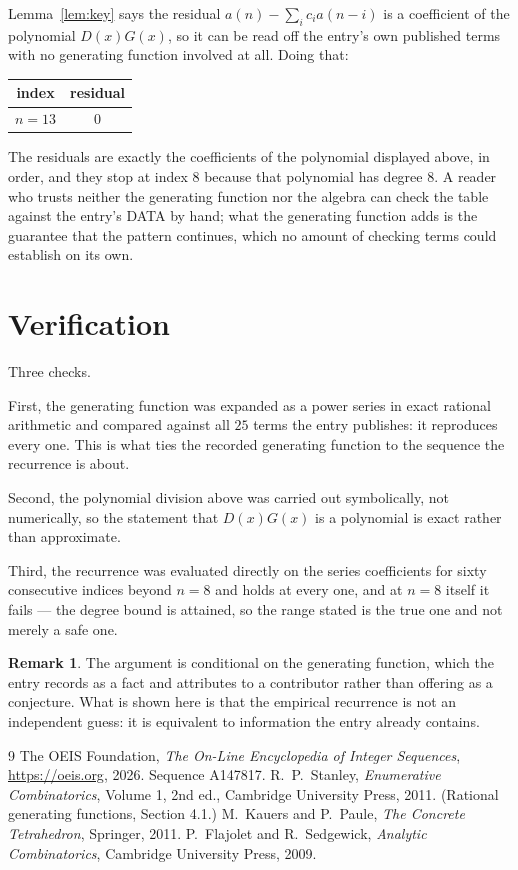 \documentclass[11pt,a4paper]{article}
\theoremstyle{plain}
\theoremstyle{definition}
\newtheorem{remark}[theorem]{Remark}
\begin{document}
Lemma~\ref{lem:key} says the residual $a(n)-\sum_ic_ia(n-i)$ is a coefficient of the
polynomial $D(x)G(x)$, so it can be read off the entry's own published terms with no
generating function involved at all. Doing that:
\begin{center}
\begin{tabular}{cc}
index & residual \\ \hline
$n=13$ & $0$
\end{tabular}
\end{center}
The residuals are exactly the coefficients of the polynomial displayed above, in order, and
they stop at index $8$ because that polynomial has degree $8$. A reader who trusts
neither the generating function nor the algebra can check the table against the entry's DATA
by hand; what the generating function adds is the guarantee that the pattern continues, which
no amount of checking terms could establish on its own.

\section{Verification}

Three checks.

First, the generating function was expanded as a power series in exact rational arithmetic and
compared against all $25$ terms the entry publishes: it reproduces every one. This is
what ties the recorded generating function to the sequence the recurrence is about.

Second, the polynomial division above was carried out symbolically, not numerically, so the
statement that $D(x)G(x)$ is a polynomial is exact rather than approximate.

Third, the recurrence was evaluated directly on the series coefficients for sixty consecutive
indices beyond $n=8$ and holds at every one, and at $n=8$ itself it fails --- the
degree bound is attained, so the range stated is the true one and not merely a safe one.

\begin{remark}
The argument is conditional on the generating function, which the entry records as a fact and
attributes to a contributor rather than offering as a conjecture. What is shown here is that
the empirical recurrence is not an independent guess: it is equivalent to information the
entry already contains.
\end{remark}

\begin{thebibliography}{9}
 The OEIS Foundation, \emph{The On-Line Encyclopedia of Integer
Sequences}, \url{https://oeis.org}, 2026. Sequence A147817.
 R.~P.~Stanley, \emph{Enumerative Combinatorics}, Volume 1, 2nd ed.,
Cambridge University Press, 2011. (Rational generating functions, Section 4.1.)
 M.~Kauers and P.~Paule, \emph{The Concrete Tetrahedron}, Springer, 2011.
 P.~Flajolet and R.~Sedgewick, \emph{Analytic Combinatorics}, Cambridge
University Press, 2009.
\end{thebibliography}
\end{document}
